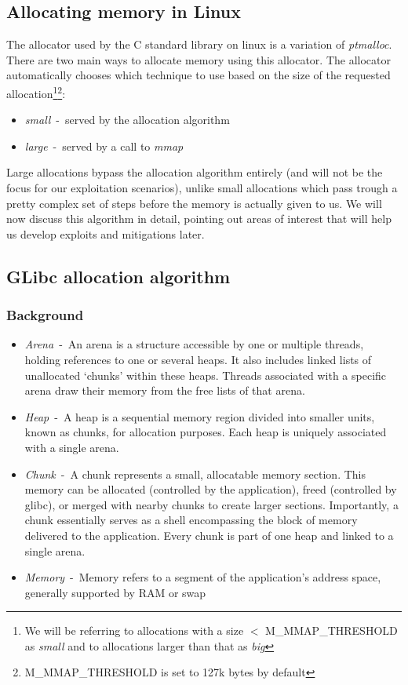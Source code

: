 \documentclass{article}
\begin{document}
\subsection{Allocating memory in Linux}
The allocator used by the C standard library on linux is a variation of
\emph{ptmalloc}. There are two main ways to allocate memory using this
allocator. The allocator automatically chooses which technique to use based on
the size of the requested allocation\footnote{We will be referring to
allocations with a size $<$ {M\_MMAP\_THRESHOLD} as \emph{small} and to
allocations larger than that as \emph{big}}\footnote{{M\_MMAP\_THRESHOLD} is set
to 127k bytes by default}:
\begin{itemize}
  \item \emph{small}~-~served by the allocation algorithm
  \item \emph{large}~-~served by a call to \emph{mmap}
\end{itemize}

Large allocations bypass the allocation algorithm entirely (and will not be the
focus for our exploitation scenarios), unlike small allocations which pass
trough a pretty complex set of steps before the memory is actually given to us.
We will now discuss this algorithm in detail, pointing out areas of interest
that will help us develop exploits and mitigations later.

\subsection{GLibc allocation algorithm}
\subsubsection{Background}
\begin{itemize}
  \item \emph{Arena}~-~An arena is a structure accessible by one or multiple
threads, holding references to one or several heaps. It also includes linked
lists of unallocated `chunks' within these heaps. Threads associated with a
specific arena draw their memory from the free lists of that arena.
  \item \emph{Heap}~-~A heap is a sequential memory region divided into smaller
units, known as chunks, for allocation purposes. Each heap is uniquely
associated with a single arena.
  \item \emph{Chunk}~-~A chunk represents a small, allocatable memory section.
This memory can be allocated (controlled by the application), freed (controlled
by glibc), or merged with nearby chunks to create larger sections. Importantly,
a chunk essentially serves as a shell encompassing the block of memory delivered
to the application. Every chunk is part of one heap and linked to a single
arena.
  \item \emph{Memory}~-~Memory refers to a segment of the application's address
space, generally supported by RAM or swap
\end{itemize}
\end{document}
